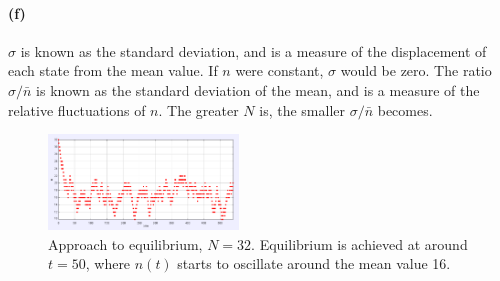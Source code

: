 \documentclass[12pt,a4paper,twocolumn]{article}
\begin{document}
\paragraph{(f)}
$\sigma$ is known as the standard deviation, and is a measure of the displacement of each state from the mean value. If $n$ were constant, $\sigma$ would be zero. The ratio $\sigma/\bar{n}$ is known as the standard deviation of the mean, and is a measure of the relative fluctuations of $n$. The greater $N$ is, the smaller $\sigma/\bar{n}$ becomes.

\begin{figure}[htb]
	\centering
	\includegraphics[width=0.45\textwidth]{equi2.png}
	\caption{Approach to equilibrium, $N = 32$. Equilibrium is achieved at around $t = 50$, where $n(t)$ starts to oscillate around the mean value 16.}
	\label{fig:gas}
\end{figure}
\end{document}
